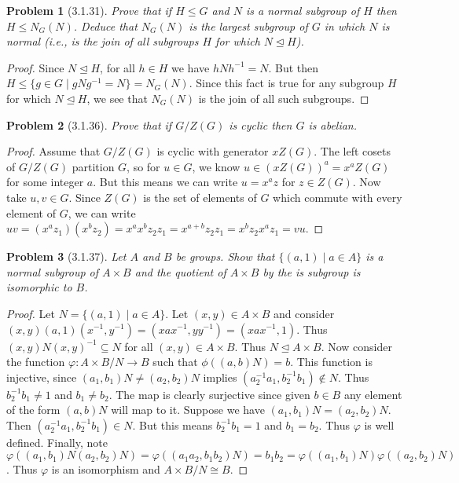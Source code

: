 \documentclass{article}
\newtheorem{problem}{Problem}
\newcommand{\normal}{\unlhd}
\begin{document}
\begin{problem}[3.1.31]
Prove that if $H \leq G$ and $N$ is a normal subgroup of $H$ then $H \leq N_G(N)$. Deduce that $N_G(N)$ is the largest subgroup of $G$ in which $N$ is normal (i.e., is the join of all subgroups $H$ for which $N \normal H$).
\end{problem}
\begin{proof}
Since $N \normal H$, for all $h \in H$ we have $hNh^{-1} = N$. But then $H \leq \{g \in G \mid gNg^{-1} = N\} = N_G(N)$. Since this fact is true for any subgroup $H$ for which $N \normal H$, we see that $N_G(N)$ is the join of all such subgroups.
\end{proof}

\begin{problem}[3.1.36]
\label{cycliccenter}
Prove that if $G/Z(G)$ is cyclic then $G$ is abelian.
\end{problem}
\begin{proof}
Assume that $G/Z(G)$ is cyclic with generator $xZ(G)$. The left cosets of $G/Z(G)$ partition $G$, so for $u \in G$, we know $u \in (xZ(G))^a = x^aZ(G)$ for some integer $a$. But this means we can write $u = x^az$ for $z \in Z(G)$. Now take $u,v \in G$. Since $Z(G)$ is the set of elements of $G$ which commute with every element of $G$, we can write $uv = (x^az_1)(x^bz_2) = x^ax^bz_2z_1 = x^{a+b}z_2z_1 = x^bz_2x^az_1 = vu$.
\end{proof}

\begin{problem}[3.1.37]
Let $A$ and $B$ be groups. Show that $\{(a,1) \mid a \in A\}$ is a normal subgroup of $A \times B$ and the quotient of $A \times B$ by the is subgroup is isomorphic to $B$.
\end{problem}
\begin{proof}
Let $N = \{(a,1) \mid a \in A\}$. Let $(x,y) \in A \times B$ and consider $(x,y)(a,1)(x^{-1},y^{-1}) = (xax^{-1},yy^{-1}) = (xax^{-1},1)$. Thus $(x,y)N(x,y)^{-1} \subseteq N$ for all $(x,y) \in A \times B$. Thus $N \normal A \times B$. Now consider the function $\varphi : A \times B/N \to B$ such that $\phi((a,b)N) = b$. This function is injective, since $(a_1,b_1)N \neq (a_2,b_2)N$ implies $(a_2^{-1}a_1, b_2^{-1}b_1) \notin N$. Thus $b_2^{-1}b_1 \neq 1$ and $b_1 \neq b_2$. The map is clearly surjective since given $b \in B$ any element of the form $(a,b)N$ will map to it. Suppose we have $(a_1,b_1)N = (a_2,b_2)N$. Then $(a_2^{-1}a_1, b_2^{-1}b_1) \in N$. But this means $b_2^{-1}b_1 = 1$ and $b_1 = b_2$. Thus $\varphi$ is well defined. Finally, note $\varphi((a_1,b_1)N(a_2,b_2)N) = \varphi((a_1a_2,b_1b_2)N) = b_1b_2 = \varphi((a_1,b_1)N)\varphi((a_2,b_2)N)$. Thus $\varphi$ is an isomorphism and $A \times B/N \cong B$.
\end{proof}
\end{document}
